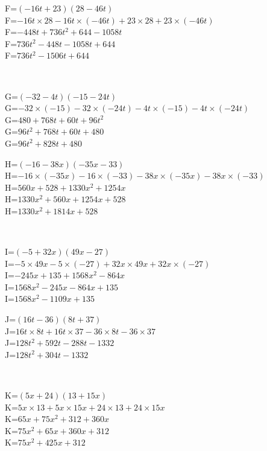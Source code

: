 \documentclass{article}%
\begin{document}
\begin{minipage}{0.5\textwidth}%
F=$(-16t+23)(28-46t)$\\%
F=$-16t \times 28-16t \times (-46t)+23 \times 28+23 \times (-46t)$\\%
F=$-448t+736t^2+644-1058t$\\%
F=$736t^2-448t-1058t+644$\\%
F=$736t^2-1506t+644$\\%
\end{minipage}%
\\%
\begin{minipage}{0.5\textwidth}%
G=$(-32-4t)(-15-24t)$\\%
G=$-32 \times (-15)-32 \times (-24t)-4t \times (-15)-4t \times (-24t)$\\%
G=$480+768t+60t+96t^2$\\%
G=$96t^2+768t+60t+480$\\%
G=$96t^2+828t+480$\\%
\end{minipage}%
\begin{minipage}{0.5\textwidth}%
H=$(-16-38x)(-35x-33)$\\%
H=$-16 \times (-35x)-16 \times (-33)-38x \times (-35x)-38x \times (-33)$\\%
H=$560x+528+1330x^2+1254x$\\%
H=$1330x^2+560x+1254x+528$\\%
H=$1330x^2+1814x+528$\\%
\end{minipage}%
\\%
\begin{minipage}{0.5\textwidth}%
I=$(-5+32x)(49x-27)$\\%
I=$-5 \times 49x-5 \times (-27)+32x \times 49x+32x \times (-27)$\\%
I=$-245x+135+1568x^2-864x$\\%
I=$1568x^2-245x-864x+135$\\%
I=$1568x^2-1109x+135$\\%
\end{minipage}%
\begin{minipage}{0.5\textwidth}%
J=$(16t-36)(8t+37)$\\%
J=$16t \times 8t+16t \times 37-36 \times 8t-36 \times 37$\\%
J=$128t^2+592t-288t-1332$\\%
J=$128t^2+304t-1332$\\%
\end{minipage}%
\\%
\begin{minipage}{0.5\textwidth}%
K=$(5x+24)(13+15x)$\\%
K=$5x \times 13+5x \times 15x+24 \times 13+24 \times 15x$\\%
K=$65x+75x^2+312+360x$\\%
K=$75x^2+65x+360x+312$\\%
K=$75x^2+425x+312$\\%
\end{minipage}%
\end{document}
